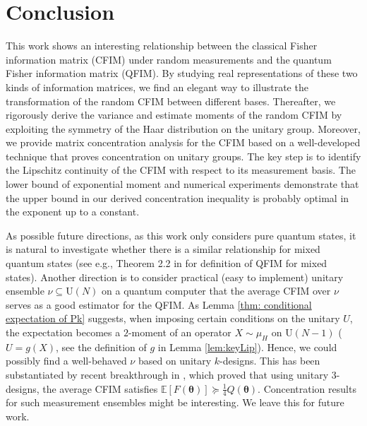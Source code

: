 \documentclass{amsart}
\theoremstyle{plain}
\theoremstyle{definition}
\theoremstyle{remark}
\newcommand{\EE}{\mathbb{E}}
\begin{document}
\section{Conclusion}\label{sec:conclusion}
This work shows an interesting relationship between the classical Fisher information matrix (CFIM) under random measurements and the quantum Fisher information matrix (QFIM). By studying real representations of these two kinds of information matrices, we find an elegant way to illustrate the transformation of the random CFIM between different bases. Thereafter, we rigorously derive the variance and estimate moments of the random CFIM by exploiting the symmetry of the Haar distribution on the unitary group. Moreover, we provide  matrix concentration analysis for the CFIM based on a well-developed technique that proves concentration on unitary groups. The key step is to identify the Lipschitz continuity of the CFIM with respect to its measurement basis. The lower bound of exponential moment and numerical experiments demonstrate that the upper bound in our derived concentration inequality is probably optimal in the exponent up to a constant.

As possible future directions, as this work only considers pure quantum states, it is natural to investigate whether there is a similar relationship for mixed quantum states (see e.g., Theorem 2.2 in \cite{Liu_2020} for definition of QFIM for mixed states). Another direction is to consider practical (easy to implement) unitary ensemble $\nu\subseteq \mathrm U(N)$ on a quantum computer that the average CFIM over $\nu$ serves as a good estimator for the QFIM. As Lemma \ref{thm: conditional expectation of Pk} suggests, when imposing certain conditions on the unitary $U$, the expectation becomes a $2$-moment of an operator $X\sim\mu_H$ on $\mathrm U(N-1)$ ($U=g(X)$, see the definition of $g$ in Lemma \ref{lem:keyLip}). Hence, we could possibly find a well-behaved $\nu$ based on unitary $k$-designs. {This has been substantiated by recent breakthrough in} \cite{zhou2025randomizedmeasurementsmultiparameterquantum}, {which proved that using unitary 3-designs, the average CFIM satisfies $\EE[F(\bm\theta)]\succeq\frac{1}{4}Q(\bm\theta)$. Concentration results for such measurement ensembles might be interesting. We leave this for future work.}  



\end{document}
